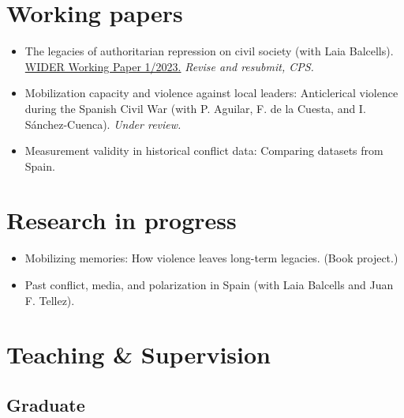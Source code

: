 \documentclass[a4paper, 12pt]{article}
\begin{document}
\section*{Working papers}

\begin{itemize}[leftmargin=*, nolistsep]
\item The legacies of authoritarian repression on civil society (with Laia Balcells).\\\href{https://doi.org/10.35188/UNU-WIDER/2023/309-3}{WIDER Working Paper 1/2023.} \textit{Revise and resubmit, CPS.}
\item Mobilization capacity and violence against local leaders: Anticlerical violence during the Spanish Civil War (with P. Aguilar, F. de la Cuesta, and I. Sánchez-Cuenca). \textit{Under review.}
\item Measurement validity in historical conflict data: Comparing datasets from Spain.
\end{itemize}

\section*{Research in progress}

\begin{itemize}[leftmargin=*, nolistsep]
\item Mobilizing memories: How violence leaves long-term legacies. (Book project.)
\item Past conflict, media, and polarization in Spain (with Laia Balcells and Juan F. Tellez).
\end{itemize}

\section*{Teaching \& Supervision}


\subsection*{Graduate}
\end{document}
